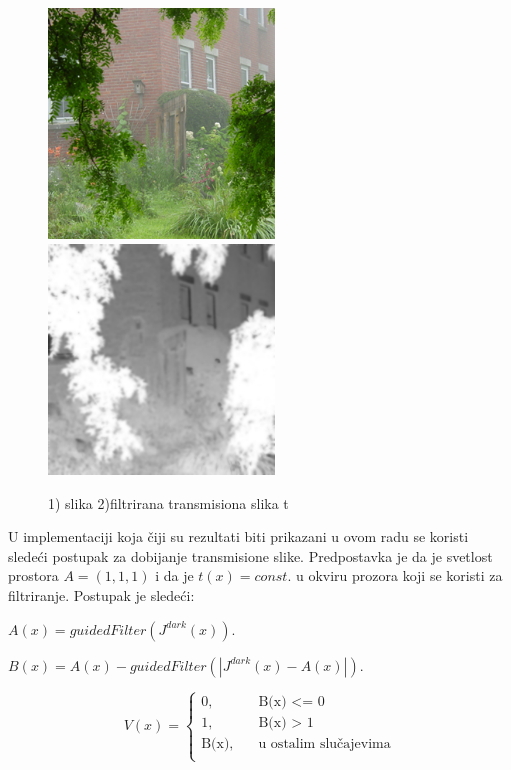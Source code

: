 \documentclass[a4paper,12pt,titlepage]{article}
\begin{document}
\begin{figure}[ht!]
\centering
\includegraphics[width=60mm]{img/haze.png}
\includegraphics[width=60mm]{img/hazeTr.png}
\caption{1) slika 2)filtrirana transmisiona slika t}
\label{overflow}
\end{figure}   

U implementaciji koja čiji su rezultati biti prikazani u ovom radu se koristi sledeći postupak za dobijanje transmisione slike. Predpostavka je da je svetlost prostora $A = (1, 1, 1)$ i da je $t(x) = const.$ u okviru prozora koji se koristi za filtriranje. Postupak je sledeći:

\begin{center}
$A(x) = guidedFilter(J^{dark}(x))$.
\end{center}

\begin{center}
$B(x) = A(x) - guidedFilter(|J^{dark}(x) - A(x)|)$.
\end{center}

\[   
V(x) = 
     \begin{cases}
       \text{0,} &\quad\text{B(x) <= 0}\\
       \text{1,} &\quad\text{B(x) > 1} \\
       \text{B(x),} &\quad\text{u ostalim slučajevima}\\
     \end{cases}
\]
\end{document}
